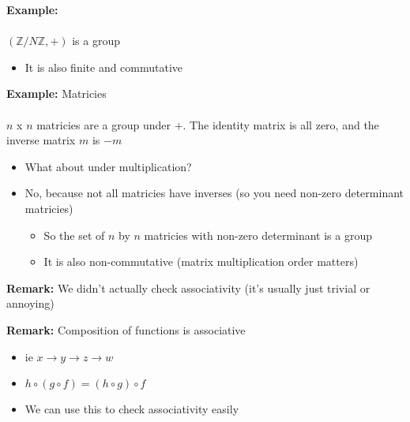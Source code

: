 \documentclass{article}
\newcommand{\Z}{\mathbb{Z}}
\begin{document}
\begin{example} 
\textbf{Example:}  \\
~\\
$(\Z /N\Z, +)$ is a group
\begin{itemize}
	\item It is also finite and commutative
\end{itemize}
\end{example}
\begin{example} 
\textbf{Example:} Matricies \\
~\\
$n$ x $n$ matricies are a group under $+$. The identity matrix is all zero, and the inverse matrix $m$ is $-m$
\begin{itemize}
	\item What about under multiplication?
	\item No, because not all matricies have inverses (so you need non-zero determinant matricies)
	\begin{itemize}
		\item So the set of $n$ by $n$ matricies with non-zero determinant is a group
		\item It is also non-commutative (matrix multiplication order matters)
	\end{itemize}
\end{itemize}
\begin{remark} 
	\textbf{Remark:} We didn't actually check associativity (it's usually just trivial or annoying) 
\end{remark}
\end{example}
\begin{remark} 
\textbf{Remark:} Composition of functions is associative
\begin{itemize}
	\item ie $x\to y\to z\to w$
	\item $h\circ (g\circ f) = (h\circ g)\circ f$
	\item We can use this to check associativity easily
\end{itemize}
\end{remark}
\end{document}
